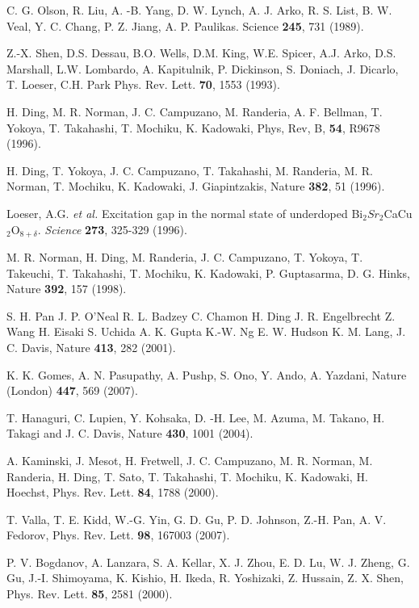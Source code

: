 \documentclass[aps,twocolumn,amsmath,amssymb,showpacs,prb,
superscriptaddress,unsortedaddress]{revtex4}
\begin{document}
\begin{thebibliography}{99}

C. G. Olson, R. Liu, A. -B. Yang, D. W. Lynch, A. J. Arko, R. S. List,
B. W. Veal, Y. C. Chang, P. Z. Jiang, A. P. Paulikas. Science {\bf
245}, 731 (1989).

Z.-X. Shen, D.S. Dessau, B.O. Wells, D.M. King, W.E. Spicer, A.J.
Arko, D.S. Marshall, L.W. Lombardo, A. Kapitulnik, P. Dickinson, S.
Doniach, J. Dicarlo, T. Loeser, C.H. Park Phys. Rev. Lett. {\bf70},
1553 (1993).

H. Ding, M. R. Norman, J. C. Campuzano, M. Randeria, A. F. Bellman, T.
Yokoya, T. Takahashi, T. Mochiku, K. Kadowaki, Phys, Rev, B, {\bf54},
R9678 (1996).

H. Ding, T. Yokoya, J. C. Campuzano, T. Takahashi, M. Randeria, M. R.
Norman, T. Mochiku, K. Kadowaki, J. Giapintzakis, Nature {\bf382}, 51
(1996).

 Loeser, A.G. {\it et al.} Excitation gap in the
normal state of underdoped Bi$_{2}$$Sr_{2}$CaCu$_{2}$O$_{8+\delta}$.
{\it Science} {\bf 273}, 325-329 (1996).

M. R. Norman, H. Ding, M. Randeria, J. C. Campuzano, T. Yokoya, T.
Takeuchi, T. Takahashi, T. Mochiku, K. Kadowaki, P. Guptasarma, D. G.
Hinks, Nature {\bf392}, 157 (1998).

S. H. Pan J. P. O'Neal R. L. Badzey C. Chamon H. Ding J. R.
Engelbrecht Z. Wang H. Eisaki S. Uchida A. K. Gupta K.-W. Ng E. W.
Hudson K. M. Lang, J. C. Davis, Nature {\bf 413}, 282 (2001).

K. K. Gomes, A. N. Pasupathy, A. Pushp, S. Ono, Y. Ando, A. Yazdani,
Nature (London) {\bf447}, 569 (2007).

T. Hanaguri, C. Lupien, Y. Kohsaka, D. -H. Lee, M. Azuma, M. Takano,
H. Takagi and J. C. Davis, Nature {\bf430}, 1001 (2004).

A. Kaminski, J. Mesot, H. Fretwell, J. C. Campuzano, M. R. Norman, M.
Randeria, H. Ding, T. Sato, T. Takahashi, T. Mochiku, K. Kadowaki, H.
Hoechst, Phys. Rev. Lett. {\bf84}, 1788 (2000).

T. Valla, T. E. Kidd, W.-G. Yin, G. D. Gu, P. D. Johnson, Z.-H. Pan,
A. V. Fedorov, Phys. Rev. Lett. {\bf98}, 167003 (2007).

P. V. Bogdanov, A. Lanzara, S. A. Kellar, X. J. Zhou, E. D. Lu, W. J.
Zheng, G. Gu, J.-I. Shimoyama, K. Kishio, H. Ikeda, R. Yoshizaki, Z.
Hussain, Z. X. Shen, Phys. Rev. Lett. {\bf85}, 2581 (2000).


\end{thebibliography}
\end{document}

